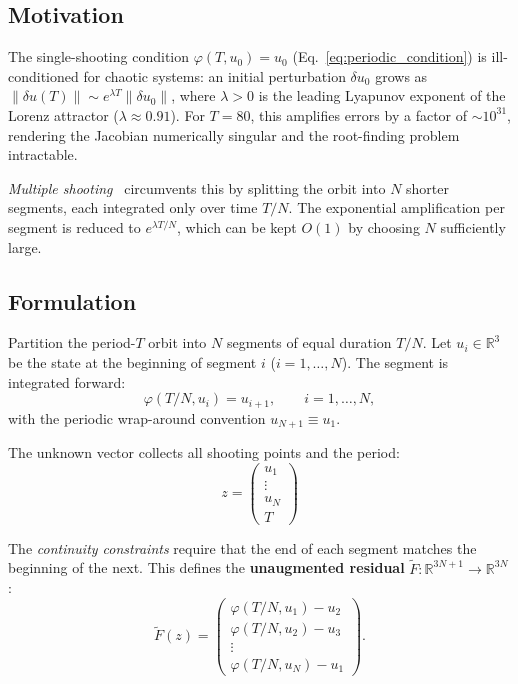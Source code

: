 \documentclass[11pt,a4paper]{article}
\begin{document}
\subsection{Motivation}
The single-shooting condition $\varphi(T, u_0) = u_0$
(Eq.~\ref{eq:periodic_condition}) is ill-conditioned for chaotic systems: an
initial perturbation $\delta u_0$ grows as
$\|\delta u(T)\| \sim e^{\lambda T}\|\delta u_0\|$, where
$\lambda > 0$ is the leading Lyapunov exponent of the Lorenz attractor
($\lambda \approx 0.91$).  For $T = 80$, this amplifies errors by a factor
of $\sim\!10^{31}$, rendering the Jacobian numerically singular and the
root-finding problem intractable.

\emph{Multiple shooting}~\cite{sanchez2004newton} circumvents this by
splitting the orbit into $N$ shorter segments, each integrated only over time
$T/N$.  The exponential amplification per segment is reduced to
$e^{\lambda T / N}$, which can be kept $O(1)$ by choosing $N$ sufficiently
large.

\subsection{Formulation}
Partition the period-$T$ orbit into $N$ segments of equal duration $T/N$.
Let $u_i \in \mathbb{R}^3$ be the state at the beginning of segment
$i$ ($i = 1, \dots, N$).  The segment is integrated forward:
\begin{equation}\label{eq:segment_integration}
  \varphi(T/N, u_i) = u_{i+1},
  \qquad i = 1, \dots, N,
\end{equation}
with the periodic wrap-around convention $u_{N+1} \equiv u_1$.

The unknown vector collects all shooting points and the period:
\begin{equation}
    z = \begin{pmatrix} u_1 \\ \vdots \\ u_N \\ T \end{pmatrix}
\end{equation}

The \emph{continuity constraints} require that the end of each segment
matches the beginning of the next.  This defines the \textbf{unaugmented
residual} $\tilde{F}: \mathbb{R}^{3N+1} \to \mathbb{R}^{3N}$:
\begin{equation}\label{eq:full_residual}
  \tilde{F}(z) =
  \begin{pmatrix}
    \varphi(T/N, u_1) - u_2 \\
    \varphi(T/N, u_2) - u_3 \\
    \vdots \\
    \varphi(T/N, u_N) - u_1
  \end{pmatrix}.
\end{equation}
\end{document}
